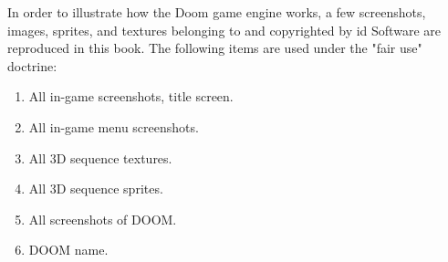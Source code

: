 In order to illustrate how the Doom game engine works, a few screenshots, images, sprites, and textures belonging to and copyrighted by id Software are reproduced in this book. The following items are used under the "fair use" doctrine:\\
\par
\begin{enumerate}
	\item All in-game screenshots, title screen.
	\item All in-game menu screenshots.
	\item All 3D sequence textures.
    \item All 3D sequence sprites.
    \item All screenshots of DOOM.
    \item DOOM name.
\end{enumerate}
